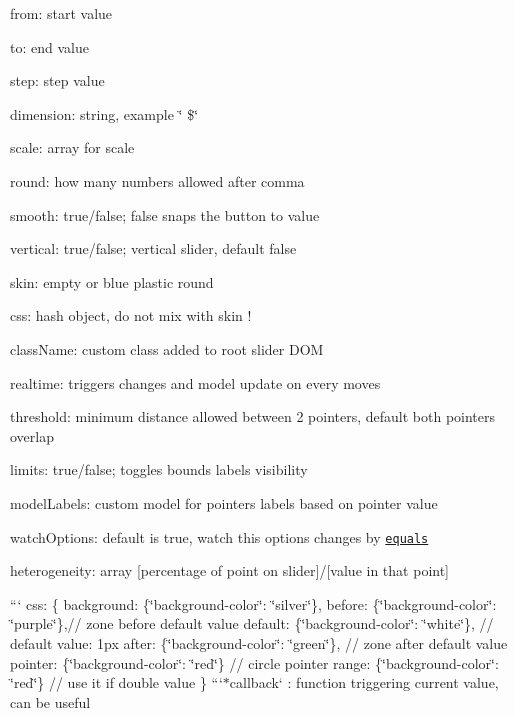 \begin{DoxyItemize}
\item {\ttfamily from}\+: start value
\item {\ttfamily to}\+: end value
\item {\ttfamily step}\+: step value
\item {\ttfamily dimension}\+: string, example \char`\"{} \$\char`\"{}
\item {\ttfamily scale}\+: array for scale
\item {\ttfamily round}\+: how many numbers allowed after comma
\item {\ttfamily smooth}\+: true/false; false snaps the button to value
\item {\ttfamily vertical}\+: true/false; vertical slider, default false
\item {\ttfamily skin}\+: empty or \textquotesingle{}blue\textquotesingle{} \textquotesingle{}plastic\textquotesingle{} \textquotesingle{}round\textquotesingle{}
\item {\ttfamily css}\+: hash object, do not mix with \textquotesingle{}skin\textquotesingle{} !
\item {\ttfamily class\+Name}\+: custom class added to root slider D\+OM
\item {\ttfamily realtime}\+: triggers changes and model update on every moves
\item {\ttfamily threshold}\+: minimum distance allowed between 2 pointers, default both pointers overlap
\item {\ttfamily limits}\+: true/false; toggles bounds labels visibility
\item {\ttfamily model\+Labels}\+: custom model for pointers labels based on pointer value
\item {\ttfamily watch\+Options}\+: default is \textquotesingle{}true\textquotesingle{}, watch this options changes by \href{https://docs.angularjs.org/api/ng/function/angular.equals}{\tt equals}
\item {\ttfamily heterogeneity}\+: array \mbox{[}percentage of point on slider\mbox{]}/\mbox{[}value in that point\mbox{]}
\end{DoxyItemize}

 ``` css\+: \{ background\+: \{\char`\"{}background-\/color\char`\"{}\+: \char`\"{}silver\char`\"{}\}, before\+: \{\char`\"{}background-\/color\char`\"{}\+: \char`\"{}purple\char`\"{}\},// zone before default value default\+: \{\char`\"{}background-\/color\char`\"{}\+: \char`\"{}white\char`\"{}\}, // default value\+: 1px after\+: \{\char`\"{}background-\/color\char`\"{}\+: \char`\"{}green\char`\"{}\}, // zone after default value pointer\+: \{\char`\"{}background-\/color\char`\"{}\+: \char`\"{}red\char`\"{}\} // circle pointer range\+: \{\char`\"{}background-\/color\char`\"{}\+: \char`\"{}red\char`\"{}\} // use it if double value \} ```{\ttfamily  $\ast$}callback` \+: function triggering current value, can be useful



